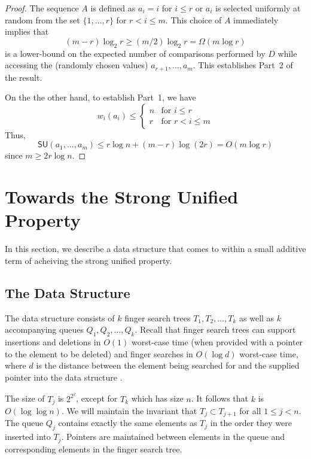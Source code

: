 \documentclass{llncs}
\newcommand{\BigOh}[1]{O\!\left(#1\right)}
\newcommand{\su}[1]{\textsf{SU}\!\left(#1\right)}
\begin{document}
\begin{proof}
  The sequence $A$ is defined as $a_i=i$ for $i\le r$ or $a_i$ is selected
  uniformly at random from the set $\{1,\ldots,r\}$ for $r< i\le m$.  This
  choice of $A$ immediately implies that 
  \[
     (m-r)\log_2 r\ge (m/2)\log_2 r = \Omega(m\log r)
  \]
  is a lower-bound on the expected number of comparisons performed by $D$
  while accessing the (randomly chosen values) $a_{r+1},\ldots,a_m$.
  This establishes Part~2 of the result.

  On the the other hand, to establish Part~1, we have
  \[
      w_i(a_i) 
        \le \begin{cases}
          n & \text{for $i\le r$} \\
          r & \text{for $r< i\le m$}
        \end{cases}
  \]
  Thus,
  \[
     \su{a_1,\ldots,a_m} \le r\log n + (m-r)\log(2r) = O(m\log r)
  \]
  since $m\ge 2r\log n$.
\end{proof}



\section{Towards the Strong Unified Property}
\label{section:main}

In this section, we describe a data structure that comes to within a small additive term of acheiving the strong unified property.

\subsection{The Data Structure}
\label{section:main:datastructure}

The data structure consists of $k$ finger search trees $T_1,T_2,\ldots,T_k$ as well as $k$ accompanying queues $Q_1,Q_2,\ldots,Q_k$. Recall that finger search trees can support insertions and deletions in $\BigOh{1}$ worst-case time (when provided with a pointer to the element to be deleted) and finger searches in $\BigOh{\log d}$ worst-case time, where $d$ is the distance between the element being searched for and the supplied pointer into the data structure \cite{DBLP:journals/jcss/BrodalLMTT03}. 

The size of $T_j$ is $2^{2^j}$, except for $T_k$ which has size $n$. It follows that $k$ is $\BigOh{\log \log n}$. We will maintain the invariant that $T_j \subset T_{j+1}$ for all $1 \le j < n$. The queue $Q_j$ contains exactly the same elements as $T_j$ in the order they were inserted into $T_j$. Pointers are maintained between elements in the queue and corresponding elements in the finger search tree.
\end{document}
